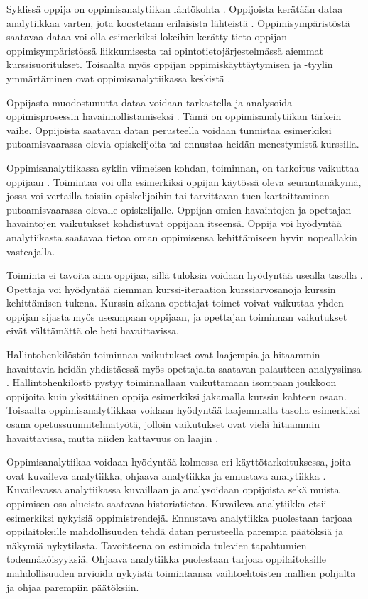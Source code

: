 Syklissä oppija on oppimisanalytiikan lähtökohta \citep{clowLearningAnalyticsCycle2012}. Oppijoista kerätään dataa analytiikkaa varten, jota koostetaan erilaisista lähteistä \citep{wolffImprovingRetentionPredicting2013}. Oppimisympäristöstä saatavaa dataa voi olla esimerkiksi lokeihin kerätty tieto oppijan oppimisympäristössä liikkumisesta tai opintotietojärjestelmässä aiemmat kurssisuoritukset. Toisaalta myös oppijan oppimiskäyttäytymisen ja -tyylin ymmärtäminen ovat oppimisanalytiikassa keskistä \citep{hasanPredictingStudentPerformance2020}.

Oppijasta muodostunutta dataa voidaan tarkastella ja analysoida oppimisprosessin havainnollistamiseksi \citep{clowLearningAnalyticsCycle2012}. Tämä on oppimisanalytiikan tärkein vaihe. Oppijoista saatavan datan perusteella voidaan tunnistaa esimerkiksi putoamisvaarassa olevia opiskelijoita tai ennustaa heidän menestymistä kurssilla.

Oppimisanalytiikassa syklin viimeisen kohdan, toiminnan, on tarkoitus vaikuttaa oppijaan \citep{clowLearningAnalyticsCycle2012}. Toimintaa voi olla esimerkiksi oppijan käytössä oleva seurantanäkymä, jossa voi vertailla toisiin opiskelijoihin tai tarvittavan tuen kartoittaminen putoamisvaarassa olevalle opiskelijalle. Oppijan omien havaintojen ja opettajan havaintojen vaikutukset kohdistuvat oppijaan itseensä. Oppija voi hyödyntää analytiikasta saatavaa tietoa oman oppimisensa kehittämiseen hyvin nopeallakin vasteajalla.

Toiminta ei tavoita aina oppijaa, sillä tuloksia voidaan hyödyntää usealla tasolla \citep{clowLearningAnalyticsCycle2012}. Opettaja voi hyödyntää aiemman kurssi-iteraation kurssiarvosanoja kurssin kehittämisen tukena. Kurssin aikana opettajat toimet voivat vaikuttaa yhden oppijan sijasta myös useampaan oppijaan, ja opettajan toiminnan vaikutukset eivät välttämättä ole heti havaittavissa.

Hallintohenkilöstön toiminnan vaikutukset ovat laajempia ja hitaammin havaittavia heidän yhdistäessä myös opettajalta saatavan palautteen analyysiinsa \citep{clowLearningAnalyticsCycle2012}. Hallintohenkilöstö pystyy toiminnallaan vaikuttamaan isompaan joukkoon oppijoita kuin yksittäinen oppija esimerkiksi jakamalla kurssin kahteen osaan. Toisaalta oppimisanalytiikkaa voidaan hyödyntää laajemmalla tasolla esimerkiksi osana opetussuunnitelmatyötä, jolloin vaikutukset ovat vielä hitaammin havaittavissa, mutta niiden kattavuus on laajin \citep{clowOverviewLearningAnalytics2013}.

Oppimisanalytiikaa voidaan hyödyntää kolmessa eri käyttötarkoituksessa, joita ovat kuvaileva analytiikka, ohjaava analytiikka ja ennustava analytiikka \citep{auvinenOppimisanalytiikkaTuleeOletko2017, danielBigDataAnalytics2015}. Kuvailevassa analytiikassa kuvaillaan ja analysoidaan oppijoista sekä muista oppimisen osa-alueista saatavaa historiatietoa. Kuvaileva analytiikka etsii esimerkiksi nykyisiä oppimistrendejä. Ennustava analytiikka puolestaan tarjoaa oppilaitoksille mahdollisuuden tehdä datan perusteella parempia päätöksiä ja näkymiä nykytilasta. Tavoitteena on estimoida tulevien tapahtumien todennäköisyyksiä. Ohjaava analytiikka puolestaan tarjoaa oppilaitoksille mahdollisuuden arvioida nykyistä toimintaansa vaihtoehtoisten mallien pohjalta ja ohjaa parempiin päätöksiin.